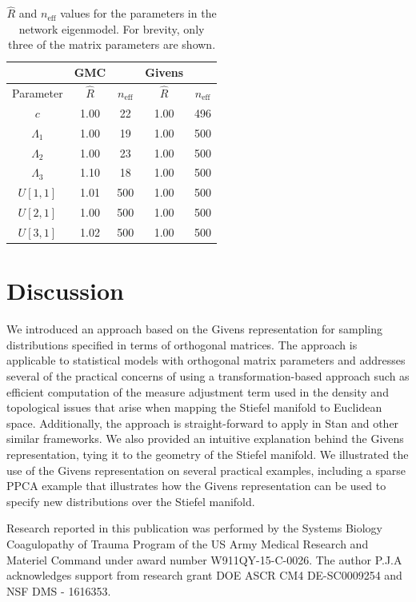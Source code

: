 \documentclass[ba]{imsart}
\numberwithin{equation}{section}
\theoremstyle{plain}
\begin{document}
\begin{table}
\begin{tabular}{|c||cc|cc|}
\hline
 & GMC & & Givens &\\
\hline
Parameter & $\hat{R}$ & $n_{\mathrm{eff}}$ & $\hat{R}$ & $n_{\mathrm{eff}}$\\
\hline
\hline
$c$ & 1.00 & 22 & 1.00 & 496\\
$\Lambda_1$ & 1.00 & 19 & 1.00 & 500\\
$\Lambda_2$ & 1.00 & 23 & 1.00 & 500\\
$\Lambda_3$ & 1.10 & 18 & 1.00 & 500\\
$U[1,1]$ & 1.01 & 500 & 1.00 & 500\\
$U[2,1]$ & 1.00 & 500 & 1.00 & 500\\
$U[3,1]$ & 1.02 & 500 & 1.00 & 500\\
\hline
\end{tabular}
\caption{$\hat{R}$ and $n_{\mathrm{eff}}$ values for the parameters in the network eigenmodel. For brevity, only three of the matrix parameters are shown.}
\label{tab:rhat_neff_eigennetwork}
\end{table}

\section{Discussion}\label{discussion}
We introduced an approach based on the Givens representation for sampling distributions specified in terms of orthogonal matrices. The approach is applicable to statistical models with orthogonal matrix parameters and addresses several of the practical concerns of using a transformation-based approach such as efficient computation of the measure adjustment term used in the density and topological issues that arise when mapping the Stiefel manifold to Euclidean space. Additionally, the approach is straight-forward to apply in Stan and other similar frameworks. We also provided an intuitive explanation behind the Givens representation, tying it to the geometry of the Stiefel manifold. We illustrated the use of the Givens representation on several practical examples, including a sparse PPCA example that illustrates how the Givens representation can be used to specify new distributions over the Stiefel manifold.

\begin{acknowledgement}
\noindent Research reported in this publication was performed by the Systems Biology Coagulopathy of Trauma Program of the US Army Medical Research and Materiel Command under award number W911QY-15-C-0026. The author P.J.A acknowledges support from research grant DOE ASCR CM4 DE-SC0009254 and NSF DMS - 1616353.
\end{acknowledgement}
\end{document}
